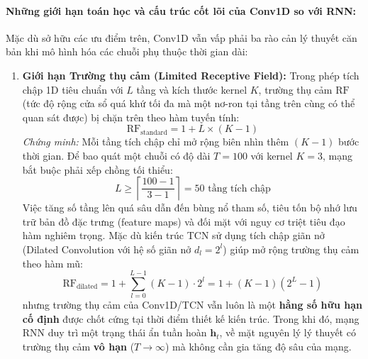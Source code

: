 \documentclass[12pt,a4paper]{report}
\begin{document}
\paragraph{Những giới hạn toán học và cấu trúc cốt lõi của Conv1D so với RNN:}
Mặc dù sở hữu các ưu điểm trên, Conv1D vẫn vấp phải ba rào cản lý thuyết căn bản khi mô hình hóa các chuỗi phụ thuộc thời gian dài:
\begin{enumerate}
    \item \textbf{Giới hạn Trường thụ cảm (Limited Receptive Field):}
    Trong phép tích chập 1D tiêu chuẩn với $L$ tầng và kích thước kernel $K$, trường thụ cảm $\text{RF}$ (tức độ rộng cửa sổ quá khứ tối đa mà một nơ-ron tại tầng trên cùng có thể quan sát được) bị chặn trên theo hàm tuyến tính:
    \begin{equation}
        \text{RF}_{\text{standard}} = 1 + L \times (K - 1)
    \end{equation}
    \textit{Chứng minh:} Mỗi tầng tích chập chỉ mở rộng biên nhìn thêm $(K - 1)$ bước thời gian. Để bao quát một chuỗi có độ dài $T = 100$ với kernel $K = 3$, mạng bắt buộc phải xếp chồng tối thiểu:
    \begin{equation}
        L \ge \left\lceil \frac{100 - 1}{3 - 1} \right\rceil = 50 \text{ tầng tích chập}
    \end{equation}
    Việc tăng số tầng lên quá sâu dẫn đến bùng nổ tham số, tiêu tốn bộ nhớ lưu trữ bản đồ đặc trưng (feature maps) và đối mặt với nguy cơ triệt tiêu đạo hàm nghiêm trọng. Mặc dù kiến trúc TCN sử dụng tích chập giãn nở (Dilated Convolution với hệ số giãn nở $d_l = 2^l$) giúp mở rộng trường thụ cảm theo hàm mũ:
    \begin{equation}
        \text{RF}_{\text{dilated}} = 1 + \sum_{l=0}^{L-1} (K - 1) \cdot 2^l = 1 + (K - 1)(2^L - 1)
    \end{equation}
    nhưng trường thụ cảm của Conv1D/TCN vẫn luôn là một \textbf{hằng số hữu hạn cố định} được chốt cứng tại thời điểm thiết kế kiến trúc. Trong khi đó, mạng RNN duy trì một trạng thái ẩn tuần hoàn $\mathbf{h}_t$, về mặt nguyên lý lý thuyết có trường thụ cảm \textbf{vô hạn} ($T \to \infty$) mà không cần gia tăng độ sâu của mạng.
    

\end{enumerate}
\end{document}

